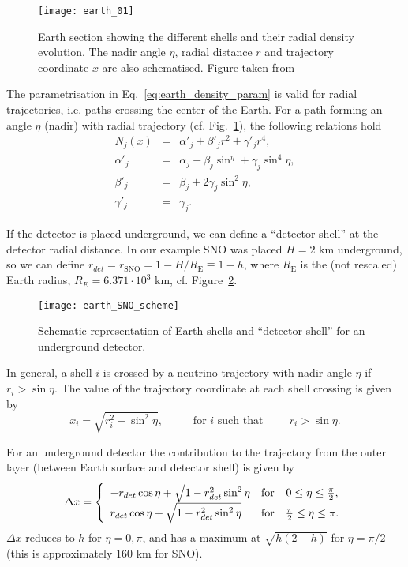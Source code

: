 \documentclass{article}
\begin{document}
\begin{figure}[htb]
	\texttt{[image: earth\_01]}
	\caption{Earth section showing the different shells and their radial density evolution. The nadir angle $\eta$, radial distance $r$ and trajectory coordinate $x$ are also schematised. Figure taken from~\cite{Lisi:1997yc}}
	\label{fig:earth_density}	
\end{figure}

The parametrisation in Eq.~\ref{eq:earth_density_param} is valid for radial trajectories, i.e. paths crossing the center of the Earth. For a path forming an angle $\eta$ (nadir) with radial trajectory (cf. Fig.~\ref{fig:earth_density}), the following relations hold
\begin{eqnarray}
	N_j(x) &=& \alpha'_j + \beta'_j r^2 + \gamma'_j r^4, \\
	\alpha'_j &=& \alpha_j + \beta_j \sin^\eta + \gamma_j \sin^4\eta, \\
	\beta'_j &=& \beta_j + 2 \gamma_j \sin^2\eta, \\
	\gamma'_j &=& \gamma_j.
\end{eqnarray}

If the detector is placed underground, we can define a ``detector shell'' at the detector radial distance. In our example SNO was placed $H=2$ km underground, so we can define $r_{det} = r_\text{SNO} = 1 - H /R_\text{E} \equiv 1 - h$, where $R_\text{E}$ is the (not rescaled) Earth radius, $R_E = 6.371 \cdot 10^3$ km, cf. Figure~\ref{fig:scheme_detector_shell}.

\begin{figure}[htb]
	\texttt{[image: earth\_SNO\_scheme]}
	\caption{Schematic representation of Earth shells and ``detector shell'' for an underground detector.}
	\label{fig:scheme_detector_shell}
\end{figure} 

In general, a shell $i$ is crossed by a neutrino trajectory with nadir angle $\eta$ if $r_i > \sin \eta$. The value of the trajectory coordinate at each shell crossing is given by 
\begin{equation}
	x_i = \sqrt{r_i^2 - \sin^2 \eta}, \hspace{1cm} \text{ for $i$ such that} \hspace{1cm} r_i > \sin \eta.
\end{equation}

For an underground detector the contribution to the trajectory from the outer layer (between Earth surface and detector shell) is given by
\begin{equation}
	 \Delta x = \left\{ \begin{array}{l c c}
		-r_{det} \cos\eta + \sqrt{1 - r_{det}^2 \sin^2 \eta} & \text{for} & 0 \leq \eta \leq \frac{\pi}{2}, \\
		r_{det} \cos\eta + \sqrt{1 - r_{det}^2 \sin^2 \eta} & \text{for} & \frac{\pi}{2} \leq \eta \leq \pi.
	\end{array} \right.
\end{equation}
$\Delta x$ reduces to $h$ for $\eta=0, \pi$, and has a maximum at $\sqrt{h(2-h)}$ for $\eta=\pi/2$ (this is approximately 160 km for SNO).
\end{document}
